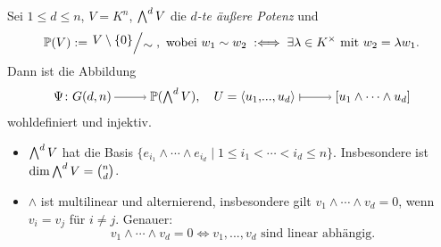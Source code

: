 \documentclass[a4paper,12pt,index=toc]{scrbook}
\theoremstyle{keinenummern} %
\def\P{\mathbb{P}}
\renewcommand{\dotsc}{\ensuremath{\!...}}
\let\grassmann\bigwedge
\def\bigwedge{\begingroup\textstyle\grassmann\endgroup}
\begin{document}
\begin{db}\label{2.7.1}
Sei $1\leq d\leq n$, $V=K^{n}$, $\bigwedge^{d}V$ die \emph{$d$-te äußere Potenz} und
\begin{equation*}\P(V):=\Quotient{V\setminus\{0\}}{\sim},\text{ wobei }w_{1}\sim w_{2}\; :\Longleftrightarrow\;\exists\lambda\in K^{\times}\text{ mit }w_{2}=\lambda w_{1}.\end{equation*}
Dann ist die Abbildung
\begin{equation*}\Psi\colon G(d,n)\ra\P(\bigwedge^{d}V),\quad U=\langle u_{1},\dotsc,u_{d}\rangle\mapsto\relax [u_{1}\wedge\dotsm\wedge u_{d}]\end{equation*}
wohldefiniert und injektiv.
\end{db}

\begin{nerinnerung}\begin{itemize}[leftmargin=*,labelindent=\parindent]
\item $\bigwedge^{d}V$ hat die Basis $\{e_{i_{1}}\wedge\dotsm\wedge e_{i_{d}}\mid 1\leq i_{1}<\dotsm<i_{d}\leq n\}$.
Insbesondere ist $\dim\bigwedge^{d}V=\binom{n}{d}$.
%
\item $\wedge$ ist multilinear und alternierend, insbesondere gilt $v_{1}\wedge\dotsm\wedge v_{d}=0$, wenn $v_{i}=v_{j}$ für $i\neq j$. Genauer:
\begin{equation*}v_{1}\wedge\dotsm\wedge v_{d}=0\iff v_{1},\dotsc, v_{d}\text{ sind linear abhängig.}\end{equation*}
\end{itemize}\end{nerinnerung}
\end{document}
